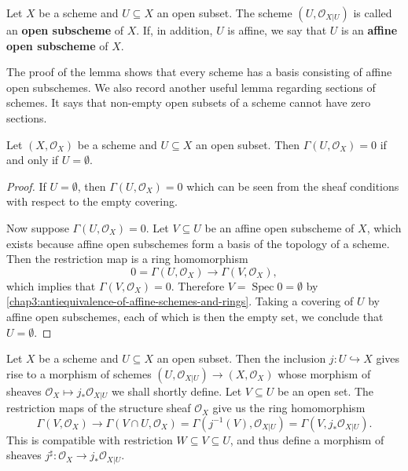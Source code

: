 \documentclass[12pt]{book}
\newcommand{\inlinedef}[1]{\textcolor{oxfordblue}{\bfseries #1}}
\theoremstyle{definition}
\DeclareMathOperator{\Spec}{Spec}
\begin{document}
	\begin{definition}
		Let $X$ be a scheme and $U \subseteq X$ an open subset. The scheme $(U, \mathcal{O}_{X|U})$ is called an \inlinedef{open subscheme} of $X$. If, in addition, $U$ is affine, we say that $U$ is an \inlinedef{affine open subscheme} of $X$.
	\end{definition}
	
	The proof of the lemma shows that every scheme has a basis consisting of affine open subschemes. We also record another useful lemma regarding sections of schemes. It says that non-empty open subsets of a scheme cannot have zero sections.
	
	\begin{lemma}\label{chap4:scheme-empty-section-iff-empty}
		Let $(X, \mathcal{O}_X)$ be a scheme and $U \subseteq X$ an open subset. Then $\Gamma(U, \mathcal{O}_X) = 0$ if and only if $U = \emptyset$.
	\end{lemma}
	\begin{proof}
		If $U = \emptyset$, then $\Gamma(U, \mathcal{O}_X) = 0$ which can be seen from the sheaf conditions with respect to the empty covering.
		
		Now suppose $\Gamma(U, \mathcal{O}_X) = 0$. Let $V \subseteq U$ be an affine open subscheme of $X$, which exists because affine open subschemes form a basis of the topology of a scheme. Then the restriction map is a ring homomorphism
		\begin{equation*}
			0 = \Gamma(U, \mathcal{O}_X) \to \Gamma(V, \mathcal{O}_X),
		\end{equation*}
		which implies that $\Gamma(V, \mathcal{O}_X) = 0$. Therefore $V = \Spec 0 = \emptyset$ by \cref{chap3:antiequivalence-of-affine-schemes-and-rings}. Taking a covering of $U$ by affine open subschemes, each of which is then the empty set, we conclude that $U = \emptyset$.
	\end{proof}
	
	Let $X$ be a scheme and $U \subseteq X$ an open subset. Then the inclusion $j \colon U \hookrightarrow X$ gives rise to a morphism of schemes $(U, \mathcal{O}_{X|U}) \to (X, \mathcal{O}_X)$ whose morphism of sheaves $\mathcal{O}_X \mapsto j_\ast \mathcal{O}_{X|U}$ we shall shortly define. Let $V \subseteq U$ be an open set. The restriction maps of the structure sheaf $\mathcal{O}_X$ give us the ring homomorphism
	\begin{equation*}
		\Gamma(V, \mathcal{O}_X) \to \Gamma(V \cap U, \mathcal{O}_X) = \Gamma(j^{-1}(V), \mathcal{O}_{X|U}) = \Gamma(V, j_\ast\mathcal{O}_{X|U}).
	\end{equation*}
	This is compatible with restriction $W \subseteq V \subseteq U$, and thus define a morphism of sheaves $j^\sharp\colon \mathcal{O}_X \to j_\ast\mathcal{O}_{X|U}$.
	
\end{document}
